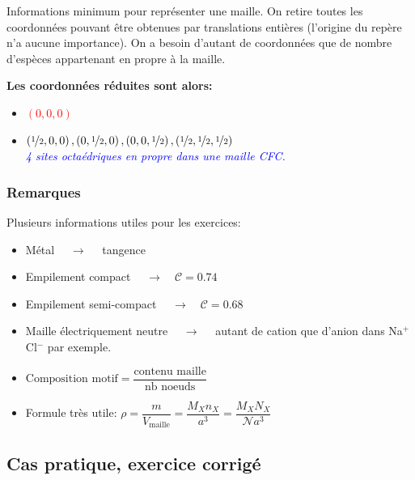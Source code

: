 \documentclass{article}
\begin{document}
Informations minimum pour représenter une maille.
On retire toutes les coordonnées pouvant être obtenues par translations entières (l'origine du repère n'a aucune importance).
On a besoin d'autant de coordonnées que de nombre d'espèces appartenant en propre à la maille.

\vspace{3mm}
\noindent\textbf{Les coordonnées réduites sont alors:}
\vspace{3mm}
\begin{itemize}[label=$\ast$]
    \item \textcolor{red}{\Large $\left(0, 0, 0\right)$}
    \item \textcolor{blue}{\Large $\left(\nicefrac{1}{2}, 0, 0\right), \left(0, \nicefrac{1}{2}, 0\right), \left(0, 0, \nicefrac{1}{2}\right), \left(\nicefrac{1}{2}, \nicefrac{1}{2}, \nicefrac{1}{2}\right)$} \\
    \textcolor{blue}{\textit{4 sites octaédriques en propre dans une maille CFC.}} 
\end{itemize}

\vspace{5mm}

\subsubsection{Remarques}

\noindent Plusieurs informations utiles pour les exercices:
\begin{itemize}[label=$\ast$]
    \item Métal $\quad \rightarrow \quad$ tangence
    \item Empilement compact $\quad \rightarrow \quad \mathcal{C} = 0.74$
    \item Empilement semi-compact $\quad \rightarrow \quad \mathcal{C} = 0.68$
    \item Maille électriquement neutre $\quad \rightarrow \quad$ autant de cation que d'anion dans Na$^+$Cl$^-$ par exemple.
    \item $\text{Composition motif} = \dfrac{\text{contenu maille}}{\text{nb noeuds}}$
    \item Formule très utile: $\rho = \dfrac{m}{V_{\text{maille}}} = \dfrac{M_X n_X}{a^3} = \dfrac{M_X N_X}{\mathcal{N}a^3}$
\end{itemize}


\subsection{Cas pratique, exercice corrigé}
\end{document}
